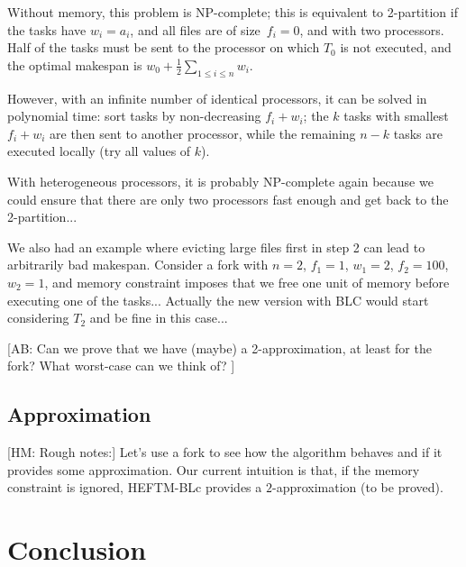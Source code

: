 \documentclass[sigconf,review,anonymous]{acmart}
\newcommand{\hmey}[1]{{\color{red}[HM: #1]}}
\newcommand{\AB}[1]{{\color{purple}[AB: #1]}}
\begin{document}
Without memory, this problem is NP-complete; this is equivalent
to 2-partition if the tasks have $w_i=a_i$, and all files are of size~$f_i=0$,
and with two processors. Half of the tasks must be sent to the processor
on which $T_0$ is not executed, and the optimal makespan is 
$w_0+\frac{1}{2}\sum_{1\leq i \leq n} w_i$.

However, with an infinite number of identical processors, it can be
solved in polynomial time: sort tasks by non-decreasing $f_i+w_i$; 
the $k$ tasks with smallest $f_i+w_i$ are then sent to another processor,
while the remaining $n-k$ tasks are executed locally (try all values of $k$).

With heterogeneous processors, it is probably NP-complete again
because we could ensure that there are only two processors fast enough
and get back to the 2-partition...

We also had an example where evicting large files first in step 2
can lead to arbitrarily bad makespan. Consider a fork with $n=2$,
$f_1=1$, $w_1=2$, $f_2=100$, $w_2=1$, and memory constraint
imposes that we free one unit of memory before executing one
of the tasks... Actually the new version with BLC would start 
considering $T_2$ and be fine in this case...


\AB{Can we prove that we have (maybe) a 2-approximation, 
at least for the fork? What worst-case can we think of? }




\subsection{Approximation}
\hmey{Rough notes:}
Let's use a fork to see how the algorithm behaves and if it provides some approximation. Our current intuition is that, if the memory constraint is ignored, HEFTM-BLc provides a $2$-approximation (to be proved).



\section{Conclusion}






    
    
\end{document}
